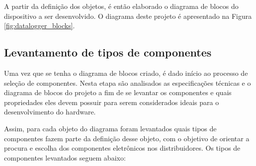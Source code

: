 A partir da definição dos objetos, é então elaborado o diagrama de blocos do dispositivo a ser desenvolvido. O diagrama deste projeto é apresentado na Figura \ref{fig:datalogger_blocks}.

    \begin{figure}[h!]
            \captionsetup{width=9cm}
   \end{figure}
\newpage
\subsection{Levantamento de tipos de componentes}\label{subsec:levantamento_tipos}


Uma vez que se tenha o diagrama de blocos criado, é dado início ao processo de seleção de componentes. Nesta etapa são analisados as especificações técnicas e o diagrama de blocos do projeto a fim de se levantar os componentes e quais propriedades eles devem possuir para serem considerados ideais para o desenvolvimento do hardware. 

Assim, para cada objeto do diagrama foram levantados quais tipos de componentes fazem parte da definição desse objeto, com o objetivo de orientar a procura e escolha dos componentes eletrônicos nos distribuidores. Os tipos de componentes levantados seguem abaixo: 

